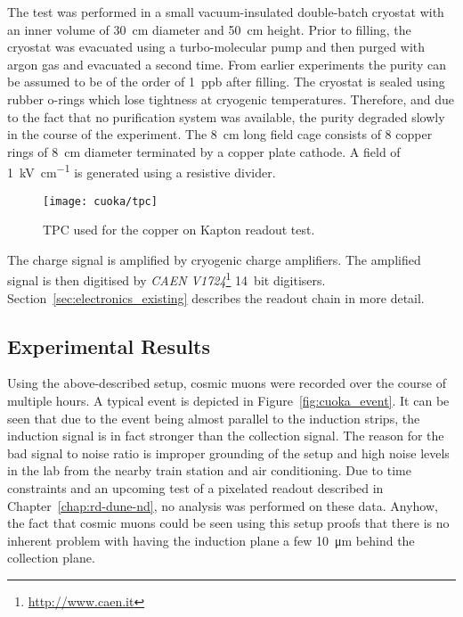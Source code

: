 The test was performed in a small vacuum-insulated double-batch cryostat with an inner volume of \SI{30}{\centi\metre} diameter and \SI{50}{\centi\metre} height. %
Prior to filling, the cryostat was evacuated using a turbo-molecular pump and then purged with argon gas and evacuated a second time.
From earlier experiments the purity can be assumed to be of the order of \SI{1}{ppb} after filling.
The cryostat is sealed using rubber o-rings which lose tightness at cryogenic temperatures.
Therefore, and due to the fact that no purification system was available, the purity degraded slowly in the course of the experiment.
The \SI{8}{\centi\metre} long field cage consists of \num{8} copper rings of \SI{8}{\centi\metre} diameter terminated by a copper plate cathode.
A field of \SI{1}{\kilo\volt\per\centi\metre} is generated using a resistive divider.

\begin{figure}[htb]
	\centering
	\texttt{[image: cuoka/tpc]}
	\caption{TPC used for the copper on Kapton readout test.}
	\label{fig:cuoka_tpc}
\end{figure}

The charge signal is amplified by cryogenic charge amplifiers.
The amplified signal is then digitised by \emph{CAEN V1724}\footnote{\url{http://www.caen.it}} \SI{14}{bit} digitisers.
Section~\ref{sec:electronics_existing} describes the readout chain in more detail.


\subsection*{Experimental Results}

Using the above-described setup, cosmic muons were recorded over the course of multiple hours.
A typical event is depicted in Figure~\ref{fig:cuoka_event}.
It can be seen that due to the event being almost parallel to the induction strips, the induction signal is in fact stronger than the collection signal.
The reason for the bad signal to noise ratio is improper grounding of the setup and high noise levels in the lab from the nearby train station and air conditioning.
Due to time constraints and an upcoming test of a pixelated readout described in Chapter~\ref{chap:rd-dune-nd}, no analysis was performed on these data.
Anyhow, the fact that cosmic muons could be seen using this setup proofs that there is no inherent problem with having the induction plane a few \SI{10}{\micro\metre} behind the collection plane.

